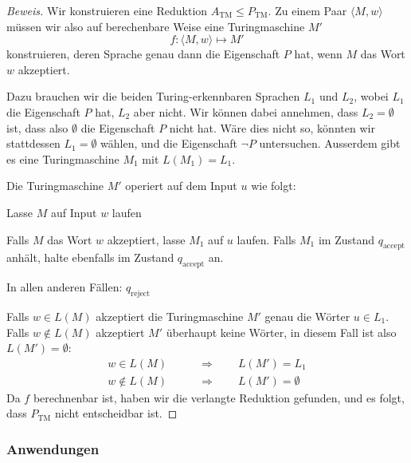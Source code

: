 \begin{proof}[Beweis]
Wir konstruieren eine Reduktion $A_\text{TM}\le P_{\text{TM}}$.
Zu einem Paar
$\langle M,w\rangle$
müssen wir also auf
berechenbare Weise eine Turingmaschine $M'$
\[
f\colon \langle M,w\rangle\mapsto M'
\]
konstruieren, deren Sprache genau dann die Eigenschaft $P$
hat, wenn $M$ das Wort $w$ akzeptiert.

Dazu brauchen wir die beiden Turing-erkennbaren Sprachen $L_1$ und $L_2$,
wobei $L_1$ die Eigenschaft $P$ hat, $L_2$ aber nicht.
Wir können dabei annehmen, dass $L_2=\emptyset$ ist, dass also
$\emptyset$ die Eigenschaft $P$ nicht hat.
Wäre dies nicht so, könnten
wir stattdessen $L_1=\emptyset$  wählen, und die Eigenschaft $\neg P$
untersuchen.
Ausserdem gibt es eine Turingmaschine $M_1$ mit $L(M_1)=L_1$.

Die Turingmaschine $M'$ operiert auf dem Input $u$ wie folgt:
\medskip
\begin{compactenum}
\item Lasse $M$ auf Input $w$ laufen
\item Falls $M$ das Wort $w$ akzeptiert, lasse $M_1$ auf $u$ laufen.
Falls $M_1$ im Zustand $q_{\text{accept}}$ anhält, halte ebenfalls
im Zustand $q_{\text{accept}}$ an.
\item In allen anderen Fällen: $q_{\text{reject}}$
\end{compactenum}
\medskip

Falls $w\in L(M)$ akzeptiert die Turingmaschine $M'$ genau die Wörter
$u\in L_1$.
Falls $w\not\in L(M)$ akzeptiert $M'$ überhaupt keine
Wörter, in diesem Fall ist also $L(M')=\emptyset$:
\begin{align*}
w\in L(M)&\qquad \Rightarrow\qquad L(M')=L_1\\
w\not\in L(M)&\qquad \Rightarrow\qquad L(M')=\emptyset
\end{align*}
Da $f$ berechnenbar ist, haben wir die verlangte Reduktion
gefunden, und es folgt, dass $P_{\text{TM}}$ nicht
entscheidbar ist.
\end{proof}

\subsubsection{Anwendungen}

